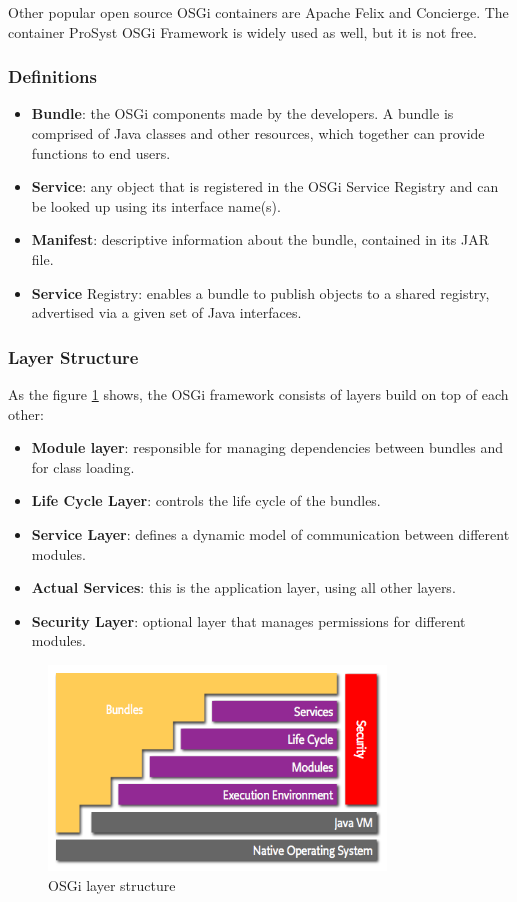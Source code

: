 Other popular open source OSGi containers are Apache Felix and Concierge. The container ProSyst OSGi Framework is widely used as
well, but it is not free.

\subsubsection{Definitions}
\begin{itemize}
	\item \textbf{Bundle}: the OSGi components made by the developers. A bundle is comprised of Java classes and other resources,
	which together can provide functions to end users.
	\item \textbf{Service}: any object that is registered in the OSGi Service Registry and can be looked up using its interface name(s).
	\item \textbf{Manifest}: descriptive information about the bundle, contained in its JAR file.
	\item \textbf{Service} Registry: enables a bundle to publish objects to a shared registry, advertised via a given set of Java interfaces.
\end{itemize}

\subsubsection{Layer Structure}
As the figure \ref{fig:osgi-layering} shows, the OSGi framework consists of layers build on top of each other:

\begin{itemize}
	\item \textbf{Module layer}: responsible for managing dependencies between bundles and for class loading.
	\item \textbf{Life Cycle Layer}: controls the life cycle of the bundles.
	\item \textbf{Service Layer}: defines a dynamic model of communication between different modules.
	\item \textbf{Actual Services}: this is the application layer, using all other layers.
	\item \textbf{Security Layer}: optional layer that manages permissions for different modules.
\end{itemize}

\begin{figure}
	\centering
	\includegraphics[width=0.8\textwidth]{images/Chapter_05/osgi-layering.png}
	\caption{OSGi layer structure}
	\label{fig:osgi-layering}
\end{figure}

